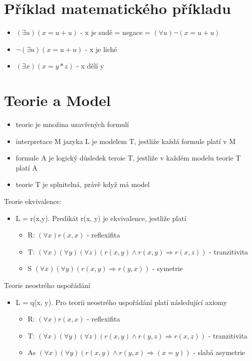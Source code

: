 \documentclass{szzclass}
\begin{document}
\section{Příklad matematického příkladu}
\begin{itemize}
  \item $(\exists{u})(x = u + u)$ - x je sudé = negace = $(\forall{u})\neg(x = u + u)$
  \item $\neg(\exists{u})(x = u + u)$ - x je liché
  \item $(\exists{x})(x = y*z)$ - x dělí y
\end{itemize}
\section{Teorie a Model}
\begin{itemize}
  \item teorie je množina uzavřených formulí
  \item interpretace M jazyka L je modelem T, jestliže každá formule platí v M
  \item formule A je logický důsledek teroie T, jestliže v každém modelu teorie T platí A
  \item teorie T je splnitelná, právě když má model
\end{itemize}
Teorie ekvivalence:
\begin{itemize}
  \item L = {r(x,y)}. Predikát r(x, y) je ekvivalence, jestliže platí
  \begin{itemize}
    \item R: $(\forall{x}) r(x,x)$ - reflexifita
    \item T: $(\forall{x})(\forall{y})(\forall{z})(r(x,y) \wedge r(x,y) \Rightarrow r(x,z))$ - tranzitivita
    \item S $(\forall{x})(\forall{y})(r(x,y) \Rightarrow r(y,x))$ - symetrie
  \end{itemize}
\end{itemize}
Teorie neostrého uspořádání
\begin{itemize}
  \item L = {q(x, y)}. Pro teorii neostrého uspořádání platí následující axiomy
  \begin{itemize}
    \item R: $(\forall{x}) r(x,x)$ - reflexifita
    \item T: $(\forall{x})(\forall{y})(\forall{z})(r(x,y) \wedge r(y,z) \Rightarrow r(x,z))$ - tranzitivita
    \item As $(\forall{x})(\forall{y})(r(x,y) \wedge r(y,x) \Rightarrow (x = y))$ - slabá asymetrie
  \end{itemize}
\end{itemize}
\end{document}
